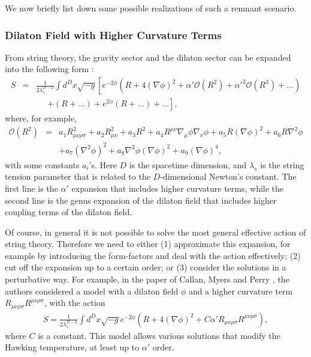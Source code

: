 \documentclass[12pt]{article}
\newcommand{\2}{$^2$}
\newcommand{\3}{$^3$}
\newcommand{\4}{$_4$}
\newcommand{\5}{$_5$}
\begin{document}
We now briefly list down some possible realizations of such a remnant scenario.

\subsubsection{Dilaton Field with Higher Curvature Terms}

From string theory, the gravity sector and the dilaton sector can be expanded into the following form \cite{Gasperini:2007zz}:
\begin{eqnarray}
S &=& \frac{1}{2\lambda_{s}^{D-2}} \int d^Dx \sqrt{-g} \left[ e^{-2\phi} \left( R + 4(\nabla \phi)^{2}  + \alpha' \mathcal{O}(R^{2}) + \alpha'^{2} \mathcal{O}(R^{3}) + ... \right) \right. \nonumber \\
&& \;\;\;\;\; \left. + \left(R + ... \right) + e^{2\phi} \left(R + ...\right) + ... \right],
\end{eqnarray}
where, for example,
\begin{eqnarray}
\mathcal{O}(R^{2}) &=& a_{1} R_{\mu\nu\rho\sigma}^{2} + a_{2} R_{\mu\nu}^{2} + a_{3} R^{2} + a_{4} R^{\mu\nu}\nabla_{\mu}\phi\nabla_{\nu}\phi + a_{5} R(\nabla \phi)^{2} + a_{6} R\nabla^{2}\phi \nonumber \\
&& + a_{7} (\nabla^{2}\phi)^{2} + a_{8} \nabla^{2}\phi(\nabla\phi)^{2} + a_{9} (\nabla \phi)^{4},
\end{eqnarray}
with some constants $a_{i}$'s. Here $D$ is the spacetime dimension, and $\lambda_{s}$ is the string tension parameter that is related to the $D$-dimensional Newton's constant. The first line is the $\alpha'$ expansion that includes higher curvature terms, while the second line is the genus expansion of the dilaton field that includes higher coupling terms of the dilaton field.

Of course, in general it is not possible to solve the most general effective action of string theory. Therefore we need to either (1) approximate this expansion, for example by introducing the form-factors \cite{Gasperini:2007zz} and deal with the action effectively; (2) cut off the expansion up to a certain order; or (3) consider the solutions in a perturbative way. For example, in the paper of Callan, Myers and Perry \cite{Callan:1988hs}, the authors considered a model with a dilaton field $\phi$ and a higher curvature term $R_{\mu\nu\rho\sigma}R^{\mu\nu\rho\sigma}$, with the action
\begin{eqnarray}
S = \frac{1}{2\lambda_{s}^{D-2}} \int d^{D}x \sqrt{-g} e^{-2\phi} \left( R + 4 \left(\nabla \phi\right)^{2} + C \alpha' R_{\mu\nu\rho\sigma}R^{\mu\nu\rho\sigma} \right),
\end{eqnarray}
where $C$ is a constant. This model allows various solutions that modify the Hawking temperature, at least up to $\alpha'$ order.
\end{document}
